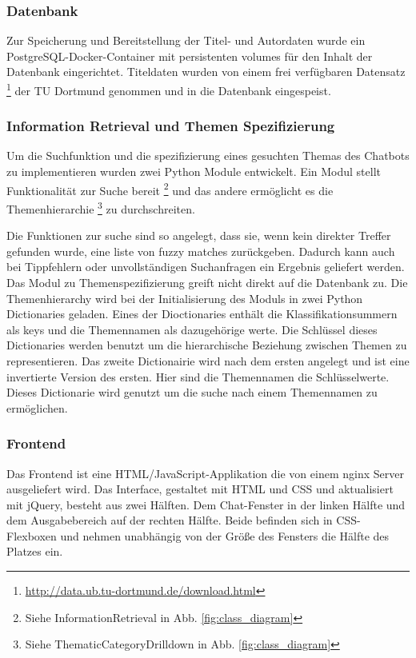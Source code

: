 \documentclass[12pt,a4paper]{article}
\begin{document}
\subsubsection{Datenbank}

Zur Speicherung und Bereitstellung der Titel- und Autordaten wurde ein PostgreSQL-Docker-Container mit persistenten volumes für den Inhalt der Datenbank eingerichtet.
Titeldaten wurden von einem frei verfügbaren Datensatz%
\footnote{\url{http://data.ub.tu-dortmund.de/download.html}}
der TU Dortmund genommen und in die Datenbank eingespeist.

\subsubsection{Information Retrieval und Themen Spezifizierung}

Um die Suchfunktion und die spezifizierung eines gesuchten Themas des Chatbots zu implementieren wurden zwei Python Module entwickelt.
Ein Modul stellt Funktionalität zur Suche bereit%
\footnote{Siehe InformationRetrieval in Abb. \ref{fig:class_diagram}}
und das andere ermöglicht es die Themenhierarchie%
 \footnote{Siehe ThematicCategoryDrilldown in Abb. \ref{fig:class_diagram}}
zu durchschreiten.

Die Funktionen zur suche sind so angelegt, dass sie, wenn kein direkter Treffer gefunden wurde, eine liste von fuzzy matches zurückgeben.
Dadurch kann auch bei Tippfehlern oder unvollständigen Suchanfragen ein Ergebnis geliefert werden.
Das Modul zu Themenspezifizierung greift nicht direkt auf die Datenbank zu.
Die Themenhierarchy wird bei der Initialisierung des Moduls in zwei Python Dictionaries geladen.
Eines der Dioctionaries enthält die Klassifikationsummern als keys und die Themennamen als dazugehörige werte.
Die Schlüssel dieses Dictionaries werden benutzt um die hierarchische Beziehung zwischen Themen zu representieren.
Das zweite Dictionairie wird nach dem ersten angelegt und ist eine invertierte Version des ersten.
Hier sind die Themennamen die Schlüsselwerte.
Dieses Dictionarie wird genutzt um die suche nach einem Themennamen zu ermöglichen.


\subsubsection{Frontend}

Das Frontend ist eine HTML/JavaScript-Applikation die von einem nginx Server ausgeliefert wird.
Das Interface, gestaltet mit HTML und CSS und aktualisiert mit jQuery, besteht aus zwei Hälften.
Dem Chat-Fenster in der linken Hälfte und dem Ausgabebereich auf der rechten Hälfte.
Beide befinden sich in CSS-Flexboxen und nehmen unabhängig von der Größe des Fensters die Hälfte des Platzes ein.
\end{document}
